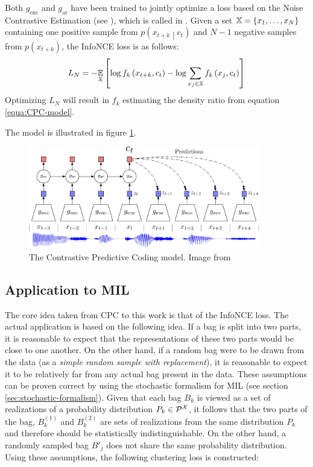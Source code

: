 Both \( g_\mathrm{enc} \) and \( g_\mathrm{ar} \) have been trained to jointly optimize a loss based on the Noise Contrastive Estimation (see \cite{gutmann_noise-contrastive_2010}), which is called  in \cite{oord_representation_2019}. Given a set \( \mathbb{X} = \left\{ x_1, \dots, x_N \right\} \) containing one positive sample from \( p \left( x_{t + k} \middle| c_t \right) \) and \( N - 1 \) negative samples from \( p \left( x_{t + k} \right) \), the InfoNCE loss is as follows:
\[ L_N = - \underset{\mathbb{X}}{\mathbb{E}} \left[ \log f_k \left( x_{t + k}, c_t \right) - \log \sum_{x_j \in \mathbb{X}} f_k \left( x_j, c_t \right) \right] \]
Optimizing \( L_N \) will result in \( f_k \) estimating the density ratio from equation \ref{equa:CPC-model}.

The model is illustrated in figure \ref{fig:CPC-paper-model}.

\begin{figure}[h]
	\centering
	\includegraphics[width=0.9\textwidth]{images/CPC-paper-model.pdf}
	\caption{The Contrastive Predictive Coding model. Image from \cite{oord_representation_2019}}\label{fig:CPC-paper-model}
\end{figure}

\subsection{Application to MIL}\label{subsec:CPC-application}

The core idea taken from CPC to this work is that of the InfoNCE loss. The actual application is based on the following idea. If a bag is split into two parts, it is reasonable to expect that the representations of these two parts would be close to one another. On the other hand, if a random bag were to be drawn from the data (as a \textit{simple random sample with replacement}), it is reasonable to expect it to be relatively far from any actual bag present in the data. These assumptions can be proven correct by using the stochastic formalism for MIL (see section \ref{sec:stochastic-formalism}). Given that each bag \( B_k \) is viewed as a set of realizations of a probability distribution \( P_k \in \mathcal{P}^\mathspace{X} \), it follows that the two parts of the bag, \( B_k^{(1)} \) and \( B_k^{(2)} \) are sets of realizations from the same distribution \( P_k \) and therefore should be statistically indistinguishable. On the other hand, a randomly sampled bag \( B'_j \) does not share the same probability distribution.
Using these assumptions, the following clustering loss is constructed:

